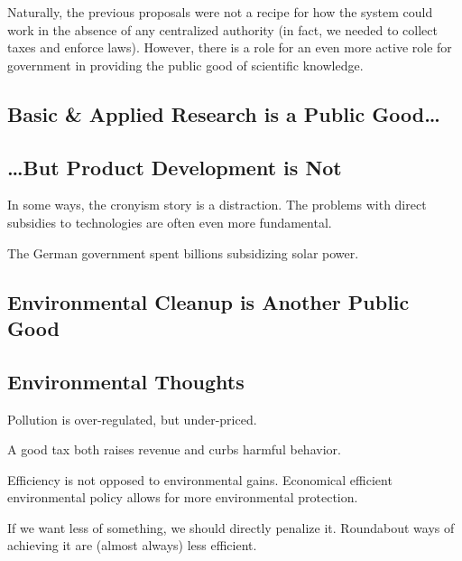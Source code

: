 Naturally, the previous proposals were not a recipe for how the system could
work in the absence of any centralized authority (in fact, we needed to collect
taxes and enforce laws). However, there is a role for an even more active role
for government in providing the public good of scientific knowledge.

\subsection{Basic \& Applied Research is a Public Good\ldots}

\subsection{\ldots But Product Development is Not}

In some ways, the cronyism story is a distraction. The problems with direct
subsidies to technologies are often even more fundamental.

The German government spent billions subsidizing solar power.

\subsection{Environmental Cleanup is Another Public Good}

\subsection{Environmental Thoughts}

\thought Pollution is over-regulated, but under-priced.

\thought A good tax both raises revenue and curbs harmful behavior.

\thought Efficiency is not opposed to environmental gains. Economical efficient
environmental policy allows for more environmental protection.

\thought If we want less of something, we should directly penalize it.
Roundabout ways of achieving it are (almost always) less efficient.

